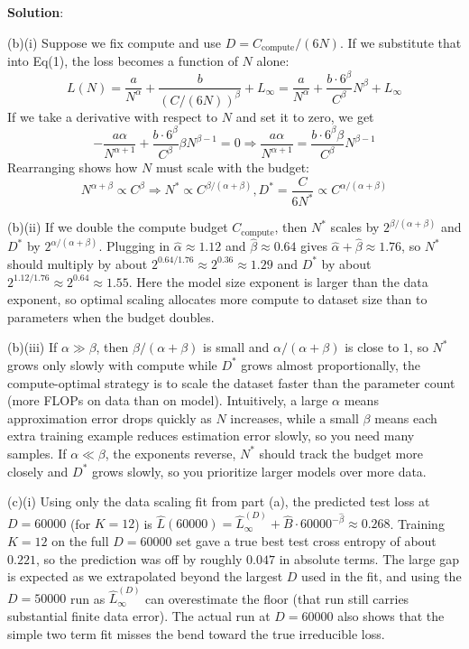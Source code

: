 \documentclass[submit]{../harvardml}
\newenvironment{solution}{
    \vspace{2mm}
    \color{blue}\noindent\textbf{Solution}:
}{}
\begin{document}
\begin{solution}
(b)(i) Suppose we fix compute and use $D = C_{\text{compute}}/(6N)$. If we substitute that into Eq(1), the loss becomes a function of $N$ alone:
\[
L(N) = \frac{a}{N^\alpha} + \frac{b}{(C/(6N))^\beta} + L_\infty = \frac{a}{N^\alpha} + \frac{b \cdot 6^\beta}{C^\beta} N^\beta + L_\infty
\]
If we take a derivative with respect to $N$ and set it to zero, we get
\[
-\frac{a\alpha}{N^{\alpha+1}} + \frac{b \cdot 6^\beta}{C^\beta} \beta N^{\beta-1} = 0 \Rightarrow \frac{a\alpha}{N^{\alpha+1}} = \frac{b \cdot 6^\beta \beta}{C^\beta} N^{\beta-1}
\]
Rearranging shows how $N$ must scale with the budget:
\[
N^{\alpha+\beta} \propto C^\beta \Rightarrow N^* \propto C^{\beta/(\alpha+\beta)}, D^* = \frac{C}{6N^*} \propto C^{\alpha/(\alpha+\beta)}
\]

(b)(ii) If we double the compute budget $C_{\text{compute}}$, then $N^*$ scales by $2^{\beta/(\alpha+\beta)}$ and $D^*$ by $2^{\alpha/(\alpha+\beta)}$. Plugging in $\hat{\alpha} \approx 1.12$ and $\hat{\beta} \approx 0.64$ gives $\hat{\alpha}+\hat{\beta} \approx 1.76$, so $N^*$ should multiply by about $2^{0.64/1.76} \approx 2^{0.36} \approx 1.29$ and $D^*$ by about $2^{1.12/1.76} \approx 2^{0.64} \approx 1.55$. Here the model size exponent is larger than the data exponent, so optimal scaling allocates more compute to dataset size than to parameters when the budget doubles.

(b)(iii) If $\alpha \gg \beta$, then $\beta/(\alpha+\beta)$ is small and $\alpha/(\alpha+\beta)$ is close to $1$, so $N^*$ grows only slowly with compute while $D^*$ grows almost proportionally, the compute-optimal strategy is to scale the dataset faster than the parameter count (more FLOPs on data than on model). Intuitively, a large $\alpha$ means approximation error drops quickly as $N$ increases, while a small $\beta$ means each extra training example reduces estimation error slowly, so you need many samples. If $\alpha \ll \beta$, the exponents reverse, $N^*$ should track the budget more closely and $D^*$ grows slowly, so you prioritize larger models over more data.

(c)(i) Using only the data scaling fit from part (a), the predicted test loss at $D=60000$ (for $K=12$) is $\hat{L}(60000) = \hat{L}_\infty^{(D)} + \hat{B} \cdot 60000^{-\hat{\beta}} \approx 0.268$. Training $K=12$ on the full $D=60000$ set gave a true best test cross entropy of about $0.221$, so the prediction was off by roughly $0.047$ in absolute terms. The large gap is expected as we extrapolated beyond the largest $D$ used in the fit, and using the $D=50000$ run as $\hat{L}_\infty^{(D)}$ can overestimate the floor (that run still carries substantial finite data error). The actual run at $D=60000$ also shows that the simple two term fit misses the bend toward the true irreducible loss.


\end{solution}
\end{document}
